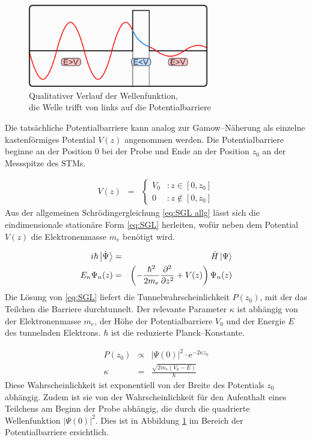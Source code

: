 \documentclass[12pt,a4paper]{scrartcl}
\numberwithin{equation}{section} %
\begin{document}
\begin{figure}[ht]
	\centering
	\includegraphics[width=0.7\textwidth]{../media/B2.5/800px-TunnelEffektKling1.png}
	\caption{Qualitativer Verlauf der Wellenfunktion, \\die Welle trifft von links auf die Potentialbarriere
		\cite{WikipediaTunneleffekt}\\}
	\label{abb:tunneleffekt}
\end{figure}

Die tatsächliche Potentialbarriere kann analog zur Gamow--Näherung als einzelne kastenförmiges Potential $V(z)$ angenommen werden. Die Potentialbarriere beginne an der Position $0$ bei der Probe und Ende an der Position $z_0$ an der Messspitze des STMs.

\begin{eqnarray}
	V(z) &=&
	\begin{cases}
		V_0 &: z \in [0, z_0] \\
		0 &: z \notin [0, z_0]
	\end{cases}
\end{eqnarray}
Aus der allgemeinen Schrödingergleichung \eqref{eq:SGL allg} lässt sich die eindimensionale stationäre Form \eqref{eq:SGL} herleiten, wofür neben dem Potential $V(z)$ die Elektronenmasse $m_e$ benötigt wird.

\begin{eqnarray}
	i\hbar \ket{\dot{\Psi}} &=& \hat H\ket{\Psi} \label{eq:SGL allg} \\
	E_n\Psi_n(z) &=&
		\left(
			-\frac{\hbar^2}{2m_e} \frac{\partial^2}{\partial z^2} + V(z)
		\right)\Psi_n(z)
		\label{eq:SGL}
\end{eqnarray}
Die Lösung von \eqref{eq:SGL} liefert die Tunnelwahrscheinlichkeit $P(z_0)$, mit der das Teilchen die Barriere durchtunnelt. Der relevante Parameter $\kappa$ ist abhängig von der Elektronenmasse $m_e$, der Höhe der Potentialbarriere $V_0$ und der Energie $E$ des tunnelnden Elektrons. $\hbar$ ist die reduzierte Planck--Konstante.

\begin{eqnarray}
	P(z_0) &\propto& |\Psi(0)|^2 \cdot \mathrm e^{-2\kappa z_0} \\
	\kappa &=& \frac{\sqrt{2m_e(V_0 - E)}}{\hbar} \label{eq:Tunnelwkt Kappa}
\end{eqnarray}
Diese Wahrscheinlichkeit ist exponentiell von der Breite des Potentials $z_0$ abhängig. Zudem ist sie von der Wahrscheinlichkeit für den Aufenthalt eines Teilchens am Beginn der Probe abhängig, die durch die quadrierte Wellenfunktion $|\Psi(0)|^2$. Dies ist in Abbildung \ref{abb:tunneleffekt} im Bereich der Potentialbarriere ersichtlich.
\end{document}
